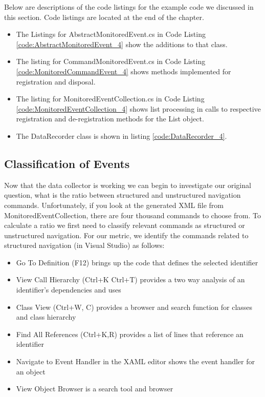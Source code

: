 Below are descriptions of the code listings for the example code we discussed in this section.  Code listings are located at the end of the chapter.
\begin{itemize}
\item
The Listings for AbstractMonitoredEvent.cs in Code Listing \ref{code:AbstractMonitoredEvent_4}  show the additions to that class.  
\item
The listing for CommandMonitoredEvent.cs in Code Listing \ref{code:MonitoredCommandEvent_4} shows methods implemented for registration and disposal.
\item
The listing for MonitoredEventCollection.cs in Code Listing \ref{code:MonitoredEventCollection_4} shows list processing in calls to respective registration and de-registration methods for the List object.
\item
The DataRecorder class is shown in listing \ref{code:DataRecorder_4}.
\end{itemize}



\subsection{Classification of Events}
Now that the data collector is working we can begin to investigate our original question, what is the ratio between structured and unstructured navigation commands.  Unfortunately, if you look at the generated XML file from MonitoredEventCollection, there are four thousand commands to choose from. To calculate a ratio we first need to classify relevant commands as structured or unstructured navigation. 
For our metric,  we identify the  commands related to structured navigation (in Visual Studio) as follows:
\begin{itemize}
\item Go To Definition (F12) brings up the code that defines the selected identifier
\item View Call Hierarchy (Ctrl+K Ctrl+T) provides a two way analysis of an identifier's dependencies and uses
\item Class View (Ctrl+W, C) provides a browser and search function for classes and class hierarchy
\item Find All References (Ctrl+K,R) provides a list of lines that reference an identifier
\item Navigate to Event Handler in the XAML editor shows the event handler for an object
\item View Object Browser is a search tool and browser
\end{itemize}

